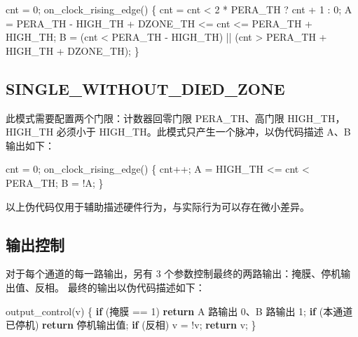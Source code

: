 \documentclass[
  12pt,
]{book}
\makeatletter
\newenvironment{Shaded}{\begin{snugshade}}{\end{snugshade}}
\newcommand{\ControlFlowTok}[1]{\textcolor[rgb]{0.13,0.29,0.53}{\textbf{#1}}}
\newcommand{\DecValTok}[1]{\textcolor[rgb]{0.00,0.00,0.81}{#1}}
\newcommand{\NormalTok}[1]{#1}
\newenvironment{kframe}{%
\medskip{}
\setlength{\fboxsep}{.8em}
 \def\at@end@of@kframe{}%
 \ifinner\ifhmode%
  \def\at@end@of@kframe{\end{minipage}}%
  \begin{minipage}{\columnwidth}%
 \fi\fi%
 \def\FrameCommand##1{\hskip\@totalleftmargin \hskip-\fboxsep
 \colorbox{shadecolor}{##1}\hskip-\fboxsep
     \hskip-\linewidth \hskip-\@totalleftmargin \hskip\columnwidth}%
 \MakeFramed {\advance\hsize-\width
   \@totalleftmargin\z@ \linewidth\hsize
   \@setminipage}}%
 {\par\unskip\endMakeFramed%
 \at@end@of@kframe}
\newenvironment{rmdblock}[1]
  {
  \begin{itemize}
  \renewcommand{\labelitemi}{
    \raisebox{-.7\height}[0pt][0pt]{
      {\setkeys{Gin}{width=3em,keepaspectratio}\texttt{[image: images/\#1]}}
    }
  }
  \setlength{\fboxsep}{1em}
  \begin{kframe}
  \item
  }
  {
  \end{kframe}
  \end{itemize}
  }
\newenvironment{rmdcaution}
  {\begin{rmdblock}{caution}}
  {\end{rmdblock}}
\makeatother
\begin{document}
\begin{Shaded}
\begin{Highlighting}[]
\NormalTok{cnt = }\DecValTok{0}\NormalTok{;}
\NormalTok{on_clock_rising_edge()}
\NormalTok{\{}
\NormalTok{    cnt = cnt < }\DecValTok{2}\NormalTok{ * PERA_TH ? cnt + }\DecValTok{1}\NormalTok{ : }\DecValTok{0}\NormalTok{;}
\NormalTok{    A = PERA_TH - HIGH_TH + DZONE_TH <= cnt <= PERA_TH + HIGH_TH;}
\NormalTok{    B = (cnt < PERA_TH - HIGH_TH) || (cnt > PERA_TH + HIGH_TH + DZONE_TH);}
\NormalTok{\}}
\end{Highlighting}
\end{Shaded}

\hypertarget{single_without_died_zone}{%
\subsection{SINGLE\_WITHOUT\_DIED\_ZONE}\label{single_without_died_zone}}

此模式需要配置两个门限：计数器回零门限 PERA\_TH、高门限 HIGH\_TH，HIGH\_TH
必须小于 HIGH\_TH。此模式只产生一个脉冲，以伪代码描述 A、B 输出如下：

\begin{Shaded}
\begin{Highlighting}[]
\NormalTok{cnt = }\DecValTok{0}\NormalTok{;}
\NormalTok{on_clock_rising_edge()}
\NormalTok{\{}
\NormalTok{    cnt++;}
\NormalTok{    A = HIGH_TH <= cnt < PERA_TH;}
\NormalTok{    B = !A;}
\NormalTok{\}}
\end{Highlighting}
\end{Shaded}

\begin{rmdcaution}
以上伪代码仅用于辅助描述硬件行为，与实际行为可以存在微小差异。
\end{rmdcaution}

\hypertarget{ux8f93ux51faux63a7ux5236}{%
\subsection{输出控制}\label{ux8f93ux51faux63a7ux5236}}

对于每个通道的每一路输出，另有 3 个参数控制最终的两路输出：掩膜、停机输出值、反相。
最终的输出以伪代码描述如下：

\begin{Shaded}
\begin{Highlighting}[]
\NormalTok{output_control(v)}
\NormalTok{\{}
    \ControlFlowTok{if}\NormalTok{ (掩膜 == }\DecValTok{1}\NormalTok{) }\ControlFlowTok{return}\NormalTok{ A 路输出 }\DecValTok{0}\NormalTok{、B 路输出 }\DecValTok{1}\NormalTok{;}
    \ControlFlowTok{if}\NormalTok{ (本通道已停机) }\ControlFlowTok{return}\NormalTok{ 停机输出值;}
    \ControlFlowTok{if}\NormalTok{ (反相) v = !v;}
    \ControlFlowTok{return}\NormalTok{ v;}
\NormalTok{\}}
\end{Highlighting}
\end{Shaded}
\end{document}
